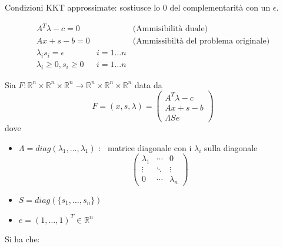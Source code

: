 Condizioni KKT approssimate:  sostiusce lo 0 del complementarit\`a con 
un $\epsilon$.
\begin{center}
\fbox
{
 \begin{minipage}[position]{0.75\textwidth}
$$
\begin{array}{lll}
A^{T}\lambda  -c = 0 & & \text{(Ammisibilit\`a duale)}  \\
 Ax +s - b = 0 & &  \text{(Ammissibilt\`a del problema originale)} \\
 \lambda_i  s_i = \epsilon & i=1\ldots n & \\
 \lambda_i \geq 0, s_i \geq 0 & i=1\ldots n  &
\end{array}
$$
\end{minipage}
}
\end{center}

Sia $F: \mathbb{R}^{n} \times \mathbb{R}^{n} \times \mathbb{R}^{n}
   \rightarrow
   \mathbb{R}^{n} \times \mathbb{R}^{n} \times \mathbb{R}^{n}$ data da
$$
F=(x, s , \lambda) =
\begin{pmatrix}
  A^{T} \lambda - c \\
  Ax  + s - b  \\
 \Lambda S e
\end{pmatrix}
$$
dove
\begin{itemize}
\item $\Lambda  = diag(\lambda_1,  \ldots , \lambda_1)$ : \ matrice diagonale con i $\lambda_i$ sulla diagonale
$$
\begin{pmatrix}
  \lambda_1 & \cdots & 0 \\
   \vdots & \ddots & \vdots \\
   0 &  \cdots & \lambda_n
\end{pmatrix}
$$
\item $S = diag(\{s_1, \ldots,  s_n \} )$
\item $e = (1, \ldots, 1)^{T} \in \mathbb{R}^{n}$
\end{itemize}
Si ha che:

